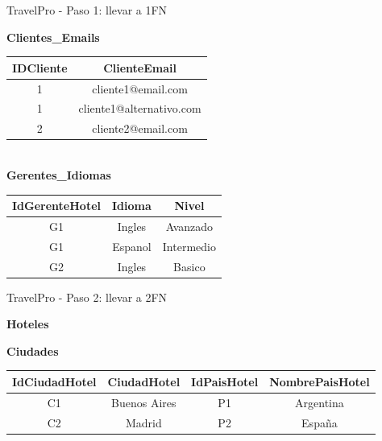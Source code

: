 \documentclass{beamer}
\begin{document}
\begin{frame}{TravelPro - Paso 1: llevar a 1FN}
    \begin{center}
    \textbf{Clientes\_Emails}\\[0.1cm]
    \begin{tabular}{cc}
        \hline
        IDCliente & ClienteEmail \\
        \hline
        1 & cliente1@email.com \\
        1 & cliente1@alternativo.com \\
        2 & cliente2@email.com \\
        \hline
    \end{tabular}
    \vspace{0.6cm}
    \textbf{\\Gerentes\_Idiomas}\\[0.1cm]
    \begin{tabular}{ccc}
        \hline
        IdGerenteHotel & Idioma & Nivel \\
        \hline
        G1 & Ingles & Avanzado \\
        G1 & Espanol & Intermedio \\
        G2 & Ingles & Basico \\
        \hline
    \end{tabular}
    \end{center}
\end{frame}

\begin{frame}{TravelPro - Paso 2: llevar a 2FN}
    \begin{center}
    \textbf{Hoteles}\\[0.1cm]
    \vspace{0.4cm}

    \textbf{Ciudades}\\[0.1cm]
    \begin{tabular}{cccc}
        \hline
        IdCiudadHotel & CiudadHotel & IdPaisHotel & NombrePaisHotel \\
        \hline
        C1 & Buenos Aires & P1 & Argentina \\
        C2 & Madrid & P2 & España \\
        \hline
    \end{tabular}
    \vspace{0.4cm}
    \end{center}
\end{frame}
\end{document}
